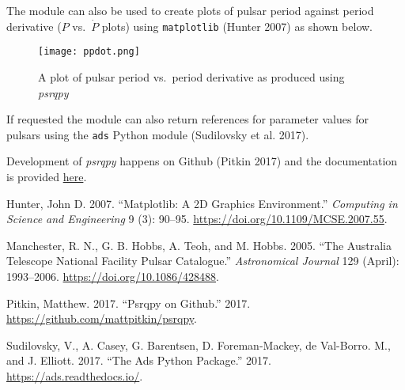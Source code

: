 \documentclass[10pt,a4paper,onecolumn]{article}
\begin{document}
The module can also be used to create plots of pulsar period against
period derivative (\(P\) vs.~\(\dot{P}\) plots) using
\texttt{matplotlib} (Hunter 2007) as shown below.

\begin{figure}
\centering
\texttt{[image: ppdot.png]}
\caption{A plot of pulsar period vs.~period derivative as produced using
\emph{psrqpy}}
\end{figure}

If requested the module can also return references for parameter values
for pulsars using the \texttt{ads} Python module (Sudilovsky et al.
2017).

Development of \emph{psrqpy} happens on Github (Pitkin 2017) and the
documentation is provided \href{http://psrqpy.readthedocs.io}{here}.

\hypertarget{refs}{}
\leavevmode\hypertarget{ref-matplotlib}{}%
Hunter, John D. 2007. ``Matplotlib: A 2D Graphics Environment.''
\emph{Computing in Science and Engineering} 9 (3): 90--95.
\url{https://doi.org/10.1109/MCSE.2007.55}.

\leavevmode\hypertarget{ref-ATNF}{}%
Manchester, R. N., G. B. Hobbs, A. Teoh, and M. Hobbs. 2005. ``The
Australia Telescope National Facility Pulsar Catalogue.''
\emph{Astronomical Journal} 129 (April): 1993--2006.
\url{https://doi.org/10.1086/428488}.

\leavevmode\hypertarget{ref-psrqpy_github}{}%
Pitkin, Matthew. 2017. ``Psrqpy on Github.'' 2017.
\url{https://github.com/mattpitkin/psrqpy}.

\leavevmode\hypertarget{ref-ADS}{}%
Sudilovsky, V., A. Casey, G. Barentsen, D. Foreman-Mackey, de Val-Borro.
M., and J. Elliott. 2017. ``The Ads Python Package.'' 2017.
\url{https://ads.readthedocs.io/}.
\end{document}
